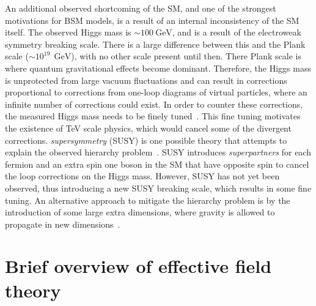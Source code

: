 An additional observed shortcoming of the SM, and one of the strongest motivations for BSM models, is a result of an internal inconsistency of the SM itself. The observed Higgs mass is $\sim \SI{100}{\giga\electronvolt}$, and is a result of the electroweak symmetry breaking scale. There is a large difference between this and the Plank scale ($\sim 10^19~\SI{}{\giga\electronvolt}$), with no other scale present until then. There Plank scale is where quantum gravitational effects become dominant. Therefore, the Higgs mass is unprotected from large vacuum fluctuations and can result in corrections proportional to corrections from one-loop diagrams of virtual particles, where an infinite number of corrections could exist. In order to counter these corrections, the measured Higgs mass needs to be finely tuned~\cite{Giudice_2008}. This fine tuning motivates the existence of TeV scale physics, which would cancel some of the divergent corrections. \emph{supersymmetry} (SUSY) is one possible theory that attempts to explain the observed hierarchy problem~\cite{MARTIN_1998}. SUSY introduces \emph{superpartners} for each fermion and an extra spin one boson in the SM that have opposite spin to cancel the loop corrections on the Higgs mass. However, SUSY has not yet been observed, thus introducing a new SUSY breaking scale, which results in some fine tuning. An alternative approach to mitigate the hierarchy problem is by the introduction of some large extra dimensions, where gravity is allowed to propagate in new dimensions~\cite{Arkani_Hamed_1998}. 

\section{Brief overview of effective field theory}

